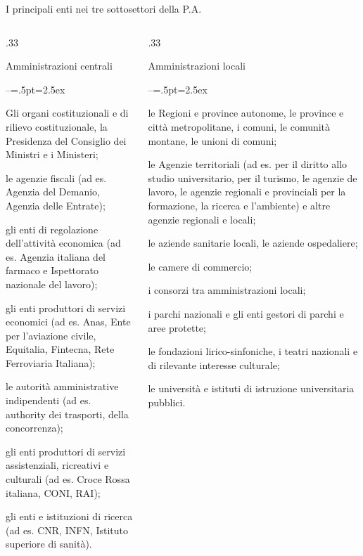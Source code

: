 \documentclass[aspectratio=149,11pt,italian]{beamer}
\newenvironment{nobulletlist}{\begin{list}{--}{\itemsep=.5pt\itemindent=2.5ex\leftmargin=0pt}}{\end{list}}
\begin{document}
\begin{frame}{I principali enti nei tre sottosettori della P.A.}
\vspace*{-5mm}
\footnotesize
\begin{columns}[t]
\begin{column}{.33\columnwidth}
\begin{block}{\footnotesize Amministrazioni centrali}
\fontsize{8}{7,5}\selectfont
\begin{nobulletlist}
\item Gli organi costituzionali e di rilievo costituzionale, la Presidenza del Consiglio dei Ministri e i Ministeri;
\item le agenzie fiscali (ad es. Agenzia del Demanio, Agenzia delle Entrate);
\item gli enti di regolazione dell’attività economica (ad es. Agenzia italiana del farmaco e Ispettorato nazionale del lavoro);
\item gli enti produttori di servizi economici (ad es. Anas, Ente per l’aviazione civile, Equitalia, Fintecna, Rete Ferroviaria Italiana);
\item le autorità amministrative indipendenti (ad es. authority dei trasporti, della concorrenza);
\item gli enti produttori di servizi assistenziali, ricreativi e culturali (ad es. Croce Rossa italiana, CONI, RAI);
\item gli enti e istituzioni di ricerca (ad es. CNR, INFN, Istituto superiore di sanità).
\end{nobulletlist}
\end{block}
\end{column}

\begin{column}{.33\columnwidth}
\begin{block}{\footnotesize Amministrazioni locali}
\fontsize{8}{7.5}\selectfont
\begin{nobulletlist}
\item le Regioni e province autonome, le province e città metropolitane, i comuni, le comunità montane, le unioni di comuni;
\item le Agenzie territoriali (ad es. per il diritto allo studio universitario, per il turismo, le agenzie de lavoro, le agenzie regionali e provinciali per la formazione, la ricerca e l’ambiente) e altre agenzie regionali e locali;
\item le aziende sanitarie locali, le aziende ospedaliere;
\item le camere di commercio;
\item i consorzi tra amministrazioni locali;
\item i parchi nazionali e gli enti gestori di parchi e aree protette;
\item le fondazioni lirico-sinfoniche, i teatri nazionali e di rilevante interesse culturale;
\item le università e istituti di istruzione universitaria pubblici.
\end{nobulletlist}
\end{block}
\end{column}


\end{columns}
\end{frame}
\end{document}

